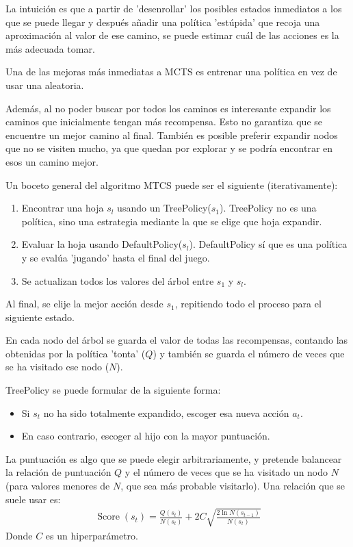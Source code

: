 La intuición es que a partir de 'desenrollar' los posibles estados inmediatos a los que
se puede llegar y después añadir una política 'estúpida' que recoja una aproximación al
valor de ese camino, se puede estimar cuál de las acciones es la más adecuada tomar.

Una de las mejoras más inmediatas a MCTS es entrenar una política en vez de usar una aleatoria.

Además, al no poder buscar por todos los caminos es interesante expandir los caminos que
inicialmente tengan más recompensa. Esto no garantiza que se encuentre un mejor camino al
final. También es posible preferir expandir nodos que no se visiten mucho, ya que quedan por
explorar y se podría encontrar en esos un camino mejor.

Un boceto general del algoritmo MTCS puede ser el siguiente (iterativamente):
\begin{enumerate}
    \item Encontrar una hoja $s_l$ usando un TreePolicy($s_1$). TreePolicy no es una política,
        sino una estrategia mediante la que se elige que hoja expandir.
    \item Evaluar la hoja usando DefaultPolicy($s_l$). DefaultPolicy sí que es una política y se
        evalúa 'jugando' hasta el final del juego.
    \item Se actualizan todos los valores del árbol entre $s_1$ y $s_l$.
\end{enumerate}
Al final, se elije la mejor acción desde $s_1$, repitiendo todo el proceso para el siguiente
estado.

En cada nodo del árbol se guarda el valor de todas las recompensas, contando las obtenidas por la
política 'tonta' ($Q$) y también se guarda el número de veces que se ha visitado ese nodo
($N$).

TreePolicy se puede formular de la siguiente forma:
\begin{itemize}
    \item Si $s_t$ no ha sido totalmente expandido, escoger esa nueva acción $a_t$.
    \item En caso contrario, escoger al hijo con la mayor puntuación.
\end{itemize}
La puntuación es algo que se puede elegir arbitrariamente, y pretende balancear la
relación de puntuación $Q$ y el número de veces que se ha visitado un nodo $N$ (para valores
menores de $N$, que sea más probable visitarlo). Una relación que se suele usar es:
\begin{align}
\operatorname { Score } ( s _ { t } ) = \frac { Q ( s _ { t } ) } { N ( s _ { t } ) } + 2 C \sqrt { \frac { 2 \operatorname { ln } N ( s _ { t - 1 } ) } { N ( s _ { t } ) } }
\end{align}
Donde $C$ es un hiperparámetro.

